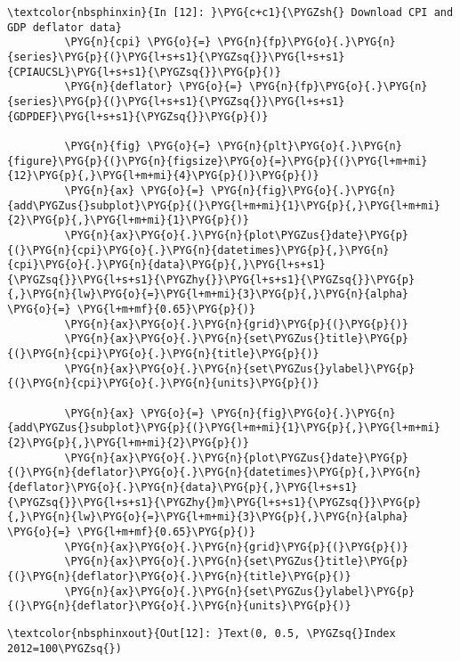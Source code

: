 \documentclass[letterpaper,10pt,openany,oneside,english]{sphinxmanual}
\begin{document}
%
\begin{Verbatim}[commandchars=\\\{\}]
\textcolor{nbsphinxin}{In [12]: }\PYG{c+c1}{\PYGZsh{} Download CPI and GDP deflator data}
         \PYG{n}{cpi} \PYG{o}{=} \PYG{n}{fp}\PYG{o}{.}\PYG{n}{series}\PYG{p}{(}\PYG{l+s+s1}{\PYGZsq{}}\PYG{l+s+s1}{CPIAUCSL}\PYG{l+s+s1}{\PYGZsq{}}\PYG{p}{)}
         \PYG{n}{deflator} \PYG{o}{=} \PYG{n}{fp}\PYG{o}{.}\PYG{n}{series}\PYG{p}{(}\PYG{l+s+s1}{\PYGZsq{}}\PYG{l+s+s1}{GDPDEF}\PYG{l+s+s1}{\PYGZsq{}}\PYG{p}{)}
         
         \PYG{n}{fig} \PYG{o}{=} \PYG{n}{plt}\PYG{o}{.}\PYG{n}{figure}\PYG{p}{(}\PYG{n}{figsize}\PYG{o}{=}\PYG{p}{(}\PYG{l+m+mi}{12}\PYG{p}{,}\PYG{l+m+mi}{4}\PYG{p}{)}\PYG{p}{)}
         \PYG{n}{ax} \PYG{o}{=} \PYG{n}{fig}\PYG{o}{.}\PYG{n}{add\PYGZus{}subplot}\PYG{p}{(}\PYG{l+m+mi}{1}\PYG{p}{,}\PYG{l+m+mi}{2}\PYG{p}{,}\PYG{l+m+mi}{1}\PYG{p}{)}
         \PYG{n}{ax}\PYG{o}{.}\PYG{n}{plot\PYGZus{}date}\PYG{p}{(}\PYG{n}{cpi}\PYG{o}{.}\PYG{n}{datetimes}\PYG{p}{,}\PYG{n}{cpi}\PYG{o}{.}\PYG{n}{data}\PYG{p}{,}\PYG{l+s+s1}{\PYGZsq{}}\PYG{l+s+s1}{\PYGZhy{}}\PYG{l+s+s1}{\PYGZsq{}}\PYG{p}{,}\PYG{n}{lw}\PYG{o}{=}\PYG{l+m+mi}{3}\PYG{p}{,}\PYG{n}{alpha} \PYG{o}{=} \PYG{l+m+mf}{0.65}\PYG{p}{)}
         \PYG{n}{ax}\PYG{o}{.}\PYG{n}{grid}\PYG{p}{(}\PYG{p}{)}
         \PYG{n}{ax}\PYG{o}{.}\PYG{n}{set\PYGZus{}title}\PYG{p}{(}\PYG{n}{cpi}\PYG{o}{.}\PYG{n}{title}\PYG{p}{)}
         \PYG{n}{ax}\PYG{o}{.}\PYG{n}{set\PYGZus{}ylabel}\PYG{p}{(}\PYG{n}{cpi}\PYG{o}{.}\PYG{n}{units}\PYG{p}{)}
         
         \PYG{n}{ax} \PYG{o}{=} \PYG{n}{fig}\PYG{o}{.}\PYG{n}{add\PYGZus{}subplot}\PYG{p}{(}\PYG{l+m+mi}{1}\PYG{p}{,}\PYG{l+m+mi}{2}\PYG{p}{,}\PYG{l+m+mi}{2}\PYG{p}{)}
         \PYG{n}{ax}\PYG{o}{.}\PYG{n}{plot\PYGZus{}date}\PYG{p}{(}\PYG{n}{deflator}\PYG{o}{.}\PYG{n}{datetimes}\PYG{p}{,}\PYG{n}{deflator}\PYG{o}{.}\PYG{n}{data}\PYG{p}{,}\PYG{l+s+s1}{\PYGZsq{}}\PYG{l+s+s1}{\PYGZhy{}m}\PYG{l+s+s1}{\PYGZsq{}}\PYG{p}{,}\PYG{n}{lw}\PYG{o}{=}\PYG{l+m+mi}{3}\PYG{p}{,}\PYG{n}{alpha} \PYG{o}{=} \PYG{l+m+mf}{0.65}\PYG{p}{)}
         \PYG{n}{ax}\PYG{o}{.}\PYG{n}{grid}\PYG{p}{(}\PYG{p}{)}
         \PYG{n}{ax}\PYG{o}{.}\PYG{n}{set\PYGZus{}title}\PYG{p}{(}\PYG{n}{deflator}\PYG{o}{.}\PYG{n}{title}\PYG{p}{)}
         \PYG{n}{ax}\PYG{o}{.}\PYG{n}{set\PYGZus{}ylabel}\PYG{p}{(}\PYG{n}{deflator}\PYG{o}{.}\PYG{n}{units}\PYG{p}{)}
\end{Verbatim}

%
\begin{Verbatim}[commandchars=\\\{\}]
\textcolor{nbsphinxout}{Out[12]: }Text(0, 0.5, \PYGZsq{}Index 2012=100\PYGZsq{})
\end{Verbatim}
\end{document}
